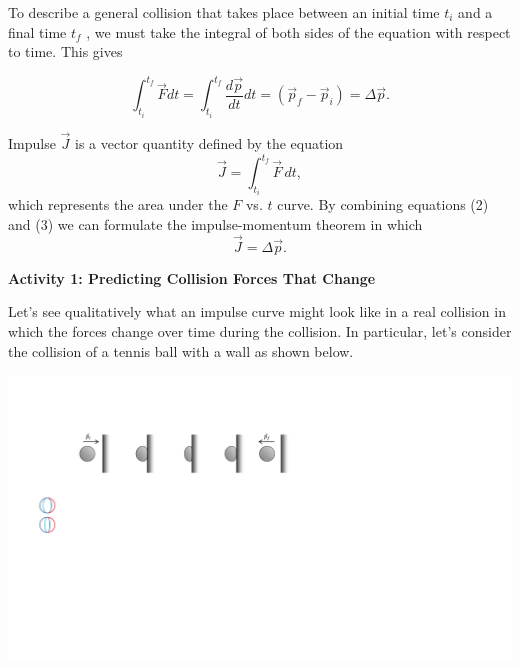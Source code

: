 To describe a general collision that takes place between an initial time $t_{i}$
and a final time $t_{f}$ , we must take the integral of both sides of the
equation with respect to time. This gives

\begin{equation}
\int _{t_{i}}^{t_{f}}{\vec  F}dt=\int _{t_{i}}^{t_{f}}\frac{d{\vec  p}}{dt}dt=\left( {{\vec  p}_{f}}-{{\vec  p}_{i}}\right) =\Delta {\vec  p}.
\end{equation}

Impulse ${\vec  J}$ is a vector quantity defined by the equation
\begin{equation}
{\vec  J}=\int_{t_{i}}^{t_{f}}{\vec  F}\,dt,
\end{equation}
which represents the area under the $F$ vs. $t$ 
curve.
By combining equations (2) and (3) we can formulate the impulse-momentum
theorem in which
\begin{equation}
{\vec  J}=\Delta {\vec  p}.
\end{equation}

\pagebreak
\textbf{Activity 1: Predicting Collision Forces That Change }

Let's see qualitatively what an impulse curve might look like in a real collision
in which the forces change over time during the collision. In particular, let's
consider the collision of a tennis ball with a wall as shown below.

\vspace{0.3cm}
{\par\centering \includegraphics{impulse/ball_hitting_wall.pdf} \par}
\vspace{0.3cm}


